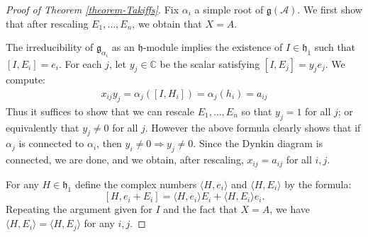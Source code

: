 \documentclass[12pt, a4paper, reqno]{amsart}
\def\ol{\overline}
\theoremstyle{definition}
\theoremstyle{definition}
\theoremstyle{definition}
\numberwithin{theorem}{section}
\numberwithin{lemma}{section}
\numberwithin{remark}{section}
\numberwithin{definition}{section}
\numberwithin{corollary}{section}
\numberwithin{proposition}{section}
\numberwithin{example}{section}
\begin{document}
	\begin{proof}[Proof of Theorem \ref{theorem-Takiffs}]	
	
		Fix \(\alpha_i\) a simple root of \(\mathfrak{g}(\mathcal{A})\).  We first show that after rescaling $E_1,\dots,E_n$, we obtain that $X=A$.
		
		The irreducibility of \(\mathfrak{g}_{\alpha_i}\) as an \(\mathfrak{h}\)-module implies the existence of \(I \in \mathfrak{h}_{\ol{1}}\) such that \([I,E_i] = e_i\). For each \(j\), let \(y_j \in \mathbb{C}\) be the scalar satisfying \([I,E_j] = y_je_j\). We compute:
		\begin{align*}
			x_{ij}y_j = \alpha_j([I,H_i]) = \alpha_j(h_i) = a_{ij}
		\end{align*}
		Thus it suffices to show that we can rescale $E_1,\dots,E_n$ so that $y_j=1$ for all $j$; or equivalently that $y_j\neq0$ for all $j$.  However the above formula clearly shows that if \(\alpha_j\) is connected to \(\alpha_i\), then $y_i\neq0\Rightarrow y_j\neq0$.  Since the Dynkin diagram is connected, we are done, and we obtain, after rescaling, $x_{ij}=a_{ij}$ for all $i,j$.
		
		For any \(H \in \mathfrak{h}_{\ol{1}}\) define the complex numbers \(\langle H , e_i \rangle \) and \(\langle H , E_i \rangle\) by the formula:
		\[
		[H,e_i+E_i] = \langle H , e_i \rangle E_i + \langle H , E_i \rangle e_i.
		\]
		Repeating the argument given for  $I$ and the fact that $X=A$, we have \(\langle H , E_i \rangle = \langle H , E_j \rangle\) for any \(i,j\). 
		

\end{proof}
\end{document}
